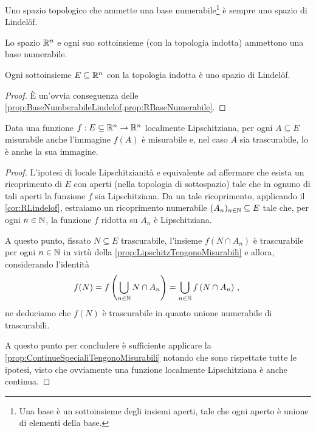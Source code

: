 \begin{proposition}\label{prop:BaseNumberabileLindelof}
	Uno spazio topologico che ammette una base numerabile\footnote{Una base è un sottoinsieme degli insiemi aperti, tale che ogni aperto è unione di elementi della base.} è sempre uno spazio di Lindelöf.
\end{proposition}

\begin{proposition}\label{prop:RBaseNumerabile}
	Lo spazio $\mathbb R^n$ e ogni suo sottoinsieme (con la topologia indotta) ammettono una base numerabile.
\end{proposition}

\begin{corollary}\label{cor:RLindelof}
	Ogni sottoinsieme $E\subseteq \mathbb R^n$ con la topologia indotta è uno spazio di Lindelöf.
\end{corollary}
\begin{proof}
	È un'ovvia conseguenza delle \cref{prop:BaseNumberabileLindelof,prop:RBaseNumerabile}.
\end{proof}

\begin{corollary}\label{cor:LocLipschitzTengonoMisurabili}
	Data una funzione $f:E\subseteq \mathbb R^n\to\mathbb R^n$ localmente Lipschitziana, per ogni $A\subseteq E$ misurabile anche l'immagine $f(A)$ è misurabile e, nel caso $A$ sia trascurabile, lo è anche la sua immagine.
\end{corollary}
\begin{proof}
	L'ipotesi di locale Lipschitzianità e equivalente ad affermare che esista un ricoprimento di $E$ con aperti (nella topologia di sottospazio) tale che in ognuno di tali aperti la funzione $f$ sia Lipschitziana. 
	Da un tale ricoprimento, applicando il \cref{cor:RLindelof}, estraiamo un ricoprimento numerabile $(A_n)_{n\in\mathbb N}\subseteq E$ tale che, per ogni $n\in\mathbb N$, la funzione $f$ ridotta su $A_n$ è Lipschitziana.
	
	A questo punto, fissato $N\subseteq E$ trascurabile, l'insieme $f(N\cap A_n)$ è trascurabile per ogni $n\in\mathbb N$ in virtù della \cref{prop:LipschitzTengonoMisurabili} e allora,  considerando l'identità
	\begin{equation*}
		f(N)=f\left(\bigcup_{n\in\mathbb N} N\cap A_n \right)= \bigcup_{n\in\mathbb N} f\left(N\cap A_n\right)\, \text{, }
	\end{equation*}
	ne deduciamo che $f(N)$ è trascurabile in quanto unione numerabile di trascurabili.
	
	A questo punto per concludere è sufficiente applicare la \cref{prop:ContinueSpecialiTengonoMisurabili} notando che sono rispettate tutte le ipotesi, visto che ovviamente una funzione localmente Lipschitziana è anche continua.
\end{proof}


